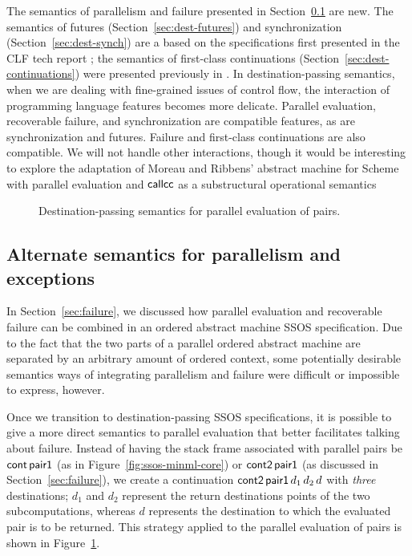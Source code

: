 The semantics of parallelism and failure presented in
Section~\ref{sec:modular-parallelism} are new. The semantics of
futures (Section~\ref{sec:dest-futures}) and synchronization
(Section~\ref{sec:dest-synch}) are a based on the specifications first
presented in the CLF tech report \cite{cervesato02concurrent}; the
semantics of first-class continuations
(Section~\ref{sec:dest-continuations}) were presented previously in
\cite{pfenning04substructural,pfenning09substructural}. In
destination-passing semantics, when we are dealing with fine-grained
issues of control flow, the interaction of programming language
features becomes more delicate.  Parallel evaluation, recoverable
failure, and synchronization are compatible features, as are
synchronization and futures. Failure and first-class continuations are
also compatible. We will not handle other interactions, though it
would be interesting to explore the adaptation of Moreau and Ribbens'
abstract machine for Scheme with parallel evaluation and ${\sf
  callcc}$ as a substructural operational semantics
\cite{moreau96semantics}

\begin{figure}
\caption{Destination-passing semantics for parallel evaluation of pairs.}
\label{fig:dest-pair}
\end{figure}

\subsection{Alternate semantics for parallelism and exceptions}
\label{sec:modular-parallelism}

In Section~\ref{sec:failure}, we discussed how parallel evaluation and
recoverable failure can be combined in an ordered abstract machine
SSOS specification. Due to the fact that the two parts of a parallel
ordered abstract machine are separated by an arbitrary amount of
ordered context, some potentially desirable semantics ways of
integrating parallelism and failure were difficult or impossible to
express, however. 

Once we transition to destination-passing SSOS specifications, it is
possible to give a more direct semantics to parallel evaluation that
better facilitates talking about failure. Instead of having the stack
frame associated with parallel pairs be ${\sf cont}\,{\sf pair1}$ (as
in Figure~\ref{fig:ssos-minml-core}) or ${\sf cont2}\,{\sf pair1}$ (as
discussed in Section~\ref{sec:failure}), we create a continuation
${\sf cont2}\,{\sf pair1}\,d_1\,d_2\,d$ with {\it three} destinations;
$d_1$ and $d_2$ represent the return destinations points of the two
subcomputations, whereas $d$ represents the destination to which the
evaluated pair is to be returned. This strategy applied to the
parallel evaluation of pairs is shown in Figure~\ref{fig:dest-pair}.

